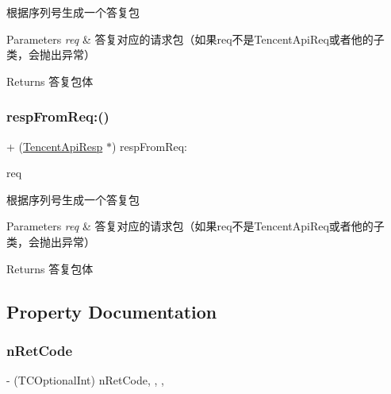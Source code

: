 根据序列号生成一个答复包 
\begin{DoxyParams}{Parameters}
{\em req} & 答复对应的请求包（如果req不是\+Tencent\+Api\+Req或者他的子类，会抛出异常） \\
\hline
\end{DoxyParams}
\begin{DoxyReturn}{Returns}
答复包体 
\end{DoxyReturn}
\mbox{\label{interface_tencent_api_resp_a2859c22affd763f1da5b5aaa3a442d7c}} 
\subsubsection{\texorpdfstring{resp\+From\+Req\+:()}{respFromReq:()}\hspace{0.1cm}{\footnotesize\ttfamily [2/2]}}
{\footnotesize\ttfamily + (\mbox{\hyperlink{interface_tencent_api_resp}{Tencent\+Api\+Resp}} $\ast$) resp\+From\+Req\+: \begin{DoxyParamCaption}\item[{(\mbox{\hyperlink{interface_tencent_api_req}{Tencent\+Api\+Req}} $\ast$)}]{req }\end{DoxyParamCaption}}

根据序列号生成一个答复包 
\begin{DoxyParams}{Parameters}
{\em req} & 答复对应的请求包（如果req不是\+Tencent\+Api\+Req或者他的子类，会抛出异常） \\
\hline
\end{DoxyParams}
\begin{DoxyReturn}{Returns}
答复包体 
\end{DoxyReturn}


\subsection{Property Documentation}
\mbox{\label{interface_tencent_api_resp_acadc81491ece925fc38f2c9bfde626b1}} 
\subsubsection{\texorpdfstring{n\+Ret\+Code}{nRetCode}}
{\footnotesize\ttfamily -\/ (T\+C\+Optional\+Int) n\+Ret\+Code\hspace{0.3cm}{\ttfamily [read]}, {\ttfamily [write]}, {\ttfamily [nonatomic]}, {\ttfamily [assign]}}

